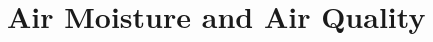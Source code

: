 \documentclass[../main]{subfiles}
\begin{document}
\chapter{Air Moisture and Air Quality} \label{chp:}



% 
\end{document}
